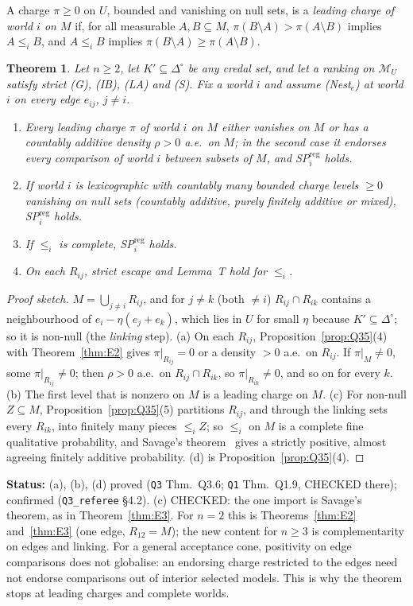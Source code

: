 \documentclass[11pt]{article}
\newtheorem{theorem}{Theorem}[section]
\theoremstyle{definition}
\theoremstyle{remark}
\newcommand{\Di}{\Delta^{\circ}}
\newcommand{\M}{\mathcal M}
\newcommand{\src}[1]{\texttt{#1}}
\newcommand{\status}[1]{\par\smallskip\noindent\textbf{Status:} #1\par\smallskip}
\begin{document}
A charge $\pi\ge0$ on $U$, bounded and vanishing on null sets, is a \emph{leading charge of world $i$ on $M$} if, for all measurable $A,B\subseteq M$, $\pi(B\setminus A)>\pi(A\setminus B)$ implies $A\le_iB$, and $A\le_iB$ implies $\pi(B\setminus A)\ge\pi(A\setminus B)$.

\begin{theorem}\label{thm:Q36}
Let $n\ge2$, let $K'\subseteq\Di$ be any credal set, and let a ranking on $\M_U$ satisfy strict (G), (IB), (LA) and (S). Fix a world $i$ and assume (Nest$_e$) at world $i$ on every edge $e_{ij}$, $j\ne i$.
\begin{enumerate}[leftmargin=*,label=(\alph*)]
\item Every leading charge $\pi$ of world $i$ on $M$ either vanishes on $M$ or has a countably additive density $\rho>0$ a.e.\ on $M$; in the second case it endorses every comparison of world $i$ between subsets of $M$, and SP$^{\mathrm{reg}}_i$ holds.
\item If world $i$ is lexicographic with countably many bounded charge levels $\ge0$ vanishing on null sets (countably additive, purely finitely additive or mixed), SP$^{\mathrm{reg}}_i$ holds.
\item If $\le_i$ is complete, SP$^{\mathrm{reg}}_i$ holds.
\item On each $R_{ij}$, strict escape and Lemma~T hold for $\le_i$.
\end{enumerate}
\end{theorem}
\begin{proof}[Proof sketch]
$M=\bigcup_{j\ne i}R_{ij}$, and for $j\ne k$ (both $\ne i$) $R_{ij}\cap R_{ik}$ contains a neighbourhood of $e_i-\eta(e_j+e_k)$, which lies in $U$ for small $\eta$ because $K'\subseteq\Di$; so it is non-null (the \emph{linking} step). (a) On each $R_{ij}$, Proposition~\ref{prop:Q35}(4) with Theorem~\ref{thm:E2} gives $\pi|_{R_{ij}}=0$ or a density $>0$ a.e.\ on $R_{ij}$. If $\pi|_M\ne0$, some $\pi|_{R_{ij}}\ne0$; then $\rho>0$ a.e.\ on $R_{ij}\cap R_{ik}$, so $\pi|_{R_{ik}}\ne0$, and so on for every $k$. (b) The first level that is nonzero on $M$ is a leading charge on $M$. (c) For non-null $Z\subseteq M$, Proposition~\ref{prop:Q35}(5) partitions $R_{ij}$, and through the linking sets every $R_{ik}$, into finitely many pieces $\le_iZ$; so $\le_i$ on $M$ is a complete fine qualitative probability, and Savage's theorem~\cite{Sav1954,Fis1986} gives a strictly positive, almost agreeing finitely additive probability. (d) is Proposition~\ref{prop:Q35}(4).
\end{proof}
\status{(a), (b), (d) proved (\src{Q3} Thm.~Q3.6; \src{Q1} Thm.~Q1.9, CHECKED there); confirmed (\src{Q3\_referee} \S4.2). (c) CHECKED: the one import is Savage's theorem, as in Theorem~\ref{thm:E3}. For $n=2$ this is Theorems~\ref{thm:E2} and~\ref{thm:E3} (one edge, $R_{12}=M$); the new content for $n\ge3$ is complementarity on edges and linking. For a general acceptance cone, positivity on edge comparisons does not globalise: an endorsing charge restricted to the edges need not endorse comparisons out of interior selected models. This is why the theorem stops at leading charges and complete worlds.}
\end{document}
